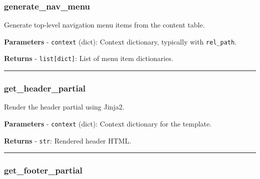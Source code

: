 \subsubsection{generate\_nav\_menu}\label{generate_nav_menu}

\begin{Shaded}
\begin{Highlighting}[]
\NormalTok{) }\OperatorTok{{-}\textgreater{}} 
\end{Highlighting}
\end{Shaded}

Generate top-level navigation menu items from the content table.

\textbf{Parameters} - \texttt{context} (dict): Context dictionary,
typically with \texttt{rel\_path}.

\textbf{Returns} - \texttt{list{[}dict{]}}: List of menu item
dictionaries.

\begin{center}\rule{0.5\linewidth}{0.5pt}\end{center}

\subsubsection{get\_header\_partial}\label{get_header_partial}

\begin{Shaded}
\begin{Highlighting}[]
\NormalTok{) }\OperatorTok{{-}\textgreater{}} 
\end{Highlighting}
\end{Shaded}

Render the header partial using Jinja2.

\textbf{Parameters} - \texttt{context} (dict): Context dictionary for
the template.

\textbf{Returns} - \texttt{str}: Rendered header HTML.

\begin{center}\rule{0.5\linewidth}{0.5pt}\end{center}

\subsubsection{get\_footer\_partial}\label{get_footer_partial}

